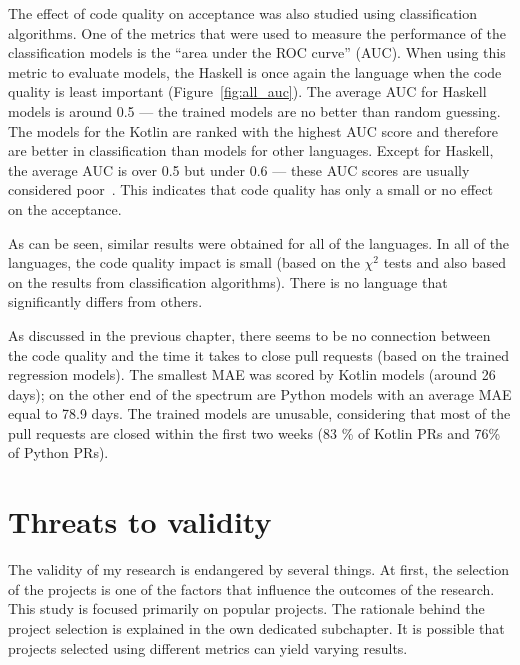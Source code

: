 \documentclass[digital,oneside,oldtable,nolof,nolot,nocover]{fithesis4}
\begin{document}
The effect of code quality on acceptance was also studied using
classification algorithms.  One of the metrics that were used to measure the
performance of the classification models is the ``area under the ROC curve''
(AUC). When using this metric to evaluate models, the Haskell is once again
the language when the code quality is least important
(Figure~\ref{fig:all_auc}). The average AUC for Haskell models is around
0.5 --- the trained models are no better than random guessing.
The models for the Kotlin are ranked with the highest AUC score and therefore
are better in classification than models for other languages.
Except for Haskell, the average AUC is over 0.5 but under 0.6 --- these AUC
scores are usually considered poor~\cite{logreg}. This indicates that code quality
has only a small or no effect on the acceptance.

As can be seen, similar results were obtained for all of the languages.
In all of the languages, the code quality impact is small (based on the \(\chi^2\) tests
and also based on the results from classification algorithms). There is no language
that significantly differs from others.

As discussed in the previous chapter, there seems to be no connection between
the code quality and the time it takes to close pull requests (based on the
trained regression models).  The smallest MAE was scored by Kotlin models
(around 26 days); on the other end of the spectrum are Python models with an
average MAE equal to 78.9 days. The trained models are unusable, considering
that most of the pull requests are closed within the first two weeks (83 \% of Kotlin
PRs and 76\% of Python PRs).
\section{Threats to validity}
\label{sec:orgad972ac}
The validity of my research is endangered by several things.
At first, the selection of the projects is one of the factors that influence
the outcomes of the research. This study is focused primarily on popular
projects. The rationale behind the project selection is explained in the own dedicated
subchapter. It is possible that projects selected using different metrics can yield
varying results.
\end{document}
